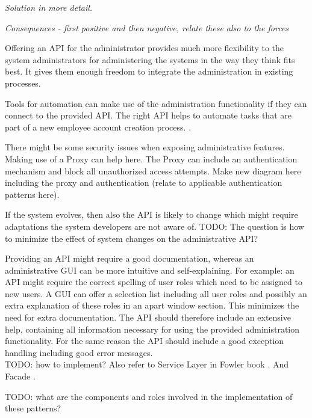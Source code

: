 \textit{Solution in more detail.}

\textit{Consequences - first positive and then negative, relate these also to the forces}

Offering an API for the administrator provides much more flexibility to the system administrators for administering the systems in the way they think fits best. It gives them enough freedom to integrate the administration in existing processes.

Tools for automation can make use of the administration functionality if they can connect to the provided API. The right API helps to automate tasks that are part of a new employee account creation process. \cite{Limoncelli2011a}.

There might be some security issues when exposing administrative features. Making use of a {\sc Proxy} \cite{Gamma95} can help here. The {\sc Proxy} can include an authentication mechanism and block all unauthorized access attempts. Make new diagram here including the proxy and authentication (relate to applicable authentication patterns here).

If the system evolves, then also the API is likely to change which might require adaptations the system developers are not aware of. TODO: The question is how to minimize the effect of system changes on the administrative API?

Providing an API might require a good documentation, whereas an administrative GUI can be more intuitive and self-explaining. For example: an API might require the correct spelling of user roles which need to be assigned to new users. A GUI can offer a selection list including all user roles and possibly an extra explanation of these roles in an apart window section. This minimizes the need for extra documentation. The API should therefore include an extensive help, containing all information necessary for using the provided administration functionality. For the same reason the API should include a good exception handling including good error messages. \\


TODO: how to implement? Also refer to {\sc Service Layer} in Fowler book \cite{Fowler:2002:PEA:579257}. And {\sc Facade} \cite{Gamma95}.  

TODO: what are the components and roles involved in the implementation of these patterns? 

